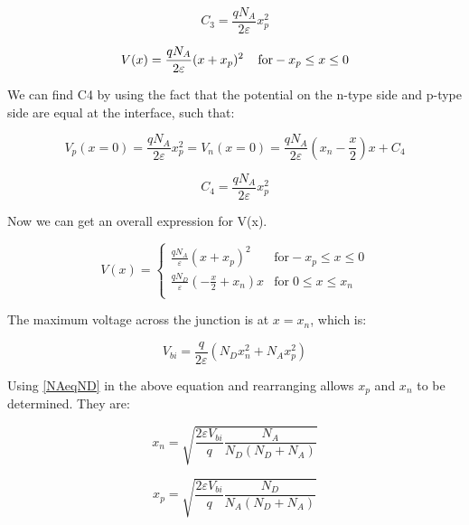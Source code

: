\begin{equation}
C_{3}=\frac{qN_{A}}{2\varepsilon}x_{p}^{2}
\end{equation}

\begin{equation}
V(x)=\frac{qN_{A}}{2\varepsilon}(x+x_{p})^{2}  \; \; \;\;  \text{for}  -x_{p}\leq x \leq 0 \\
\end{equation}

We can find C4 by using the fact that the potential on the n-type side and p-type side are equal at the interface, such that:

\begin{equation}
V_{p}(x=0)=\frac{qN_{A}}{2\varepsilon}x_{p}^2=V_{n}(x=0)=\frac{qN_{A}}{2\varepsilon}(x_{n}-\frac{x}{2})x+C_{4}
\end{equation}

\begin{equation}
C_{4}=\frac{qN_{A}}{2\varepsilon}x_{p}^2
\end{equation}

Now we can get an overall expression for V(x).

\begin{equation}
V(x) = \begin{cases}
       \frac{qN_{A}}{\varepsilon}(x+x_{p})^2 & \text{for}  -x_{p}\leq x \leq 0 \\
       \frac{qN_{D}}{\varepsilon}(-\frac{x}{2}+x_{n})x  &  \text{for} \; 0 \leq x \leq x_{n}  \\
     \end{cases}
\end{equation}

The maximum voltage across the junction is at  $x= x_{n}$, which is:

\begin{equation}
V_{bi}=\frac{q}{2\varepsilon}(N_{D}x_{n}^2+N_{A}x_{p}^2)
\end{equation}

Using \eqref{NAeqND} in the above equation and rearranging allows $x_{p}$ and $x_{n}$ to be determined. They are:

\begin{equation}
x_{n}=\sqrt{\frac{2\varepsilon V_{bi}}{q}\frac{N_{A}}{N_{D}(N_{D}+N_{A})}}
\end{equation}

\begin{equation}
x_{p}=\sqrt{\frac{2\varepsilon V_{bi}}{q}\frac{N_{D}}{N_{A}(N_{D}+N_{A})}}
\end{equation}


